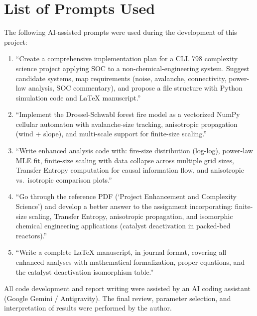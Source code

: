 \documentclass[12pt, a4paper]{article}
\begin{document}
\appendix
\section{List of Prompts Used}
\label{app:prompts}

The following AI-assisted prompts were used during the development of this project:

\begin{enumerate}
    \item ``Create a comprehensive implementation plan for a CLL 798 complexity science project applying SOC to a non-chemical-engineering system. Suggest candidate systems, map requirements (noise, avalanche, connectivity, power-law analysis, SOC commentary), and propose a file structure with Python simulation code and LaTeX manuscript.''
    
    \item ``Implement the Drossel-Schwabl forest fire model as a vectorized NumPy cellular automaton with avalanche-size tracking, anisotropic propagation (wind + slope), and multi-scale support for finite-size scaling.''
    
    \item ``Write enhanced analysis code with: fire-size distribution (log-log), power-law MLE fit, finite-size scaling with data collapse across multiple grid sizes, Transfer Entropy computation for causal information flow, and anisotropic vs.\ isotropic comparison plots.''
    
    \item ``Go through the reference PDF (`Project Enhancement and Complexity Science') and develop a better answer to the assignment incorporating: finite-size scaling, Transfer Entropy, anisotropic propagation, and isomorphic chemical engineering applications (catalyst deactivation in packed-bed reactors).''
    
    \item ``Write a complete LaTeX manuscript, in journal format, covering all enhanced analyses with mathematical formalization, proper equations, and the catalyst deactivation isomorphism table.''
\end{enumerate}

All code development and report writing were assisted by an AI coding assistant (Google Gemini / Antigravity). The final review, parameter selection, and interpretation of results were performed by the author.
\end{document}
